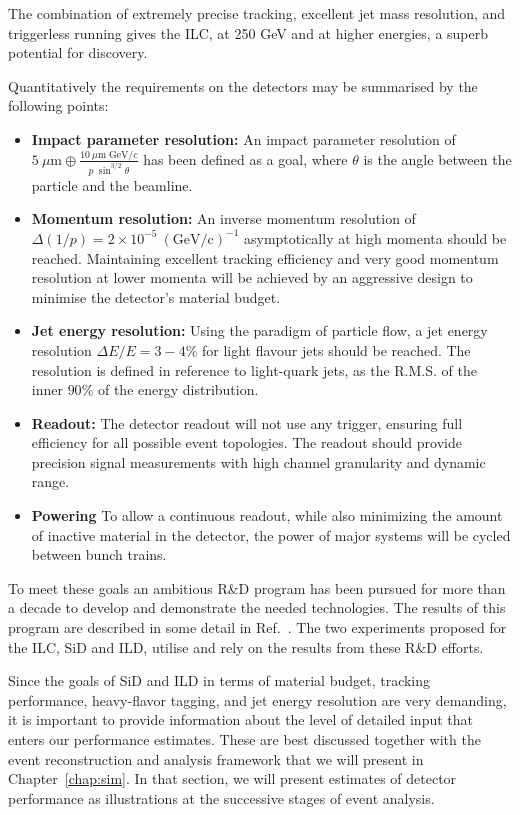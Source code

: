The combination of extremely precise tracking, excellent jet mass
resolution, and triggerless running gives the ILC, at 250 GeV and at
higher energies, a superb potential for discovery. 


Quantitatively the requirements on the detectors may be summarised by the following points: 
\begin{itemize}
    \item {\bf Impact parameter resolution:}  An impact parameter resolution of 
   $ 5~\mu \mathrm{m} \oplus \frac{10~\mu \mathrm{m} \; \mathrm{GeV}/c}{ p\;\sin^{3/2}\theta}$  
   has been defined as a goal, where $\theta$ is the angle between the particle and the beamline. 
    \item {\bf Momentum resolution:} An inverse momentum resolution of $\Delta (1 / p) = 2 \times 10^{-5}~\mathrm{(GeV/c)}^{-1}$
    asymptotically at high momenta should be reached. Maintaining excellent tracking efficiency and very good momentum resolution at lower momenta will be achieved by an aggressive design to minimise the detector's material budget.
    \item {\bf Jet energy resolution:} Using the paradigm of particle flow, a jet energy resolution $\Delta E/ E = 3-4\%$ for light flavour jets should be reached. The resolution is defined in reference to light-quark jets, as the R.M.S. of the inner $90\%$ of the energy distribution. 
    \item {\bf Readout:} The detector readout will not use any trigger, ensuring full efficiency for all possible event topologies.  The readout should provide precision signal measurements with high channel granularity and dynamic range.
    \item {\bf Powering} To allow a continuous readout, while also minimizing the amount of inactive material in the detector, the power of major systems will be cycled between bunch trains. 
\end{itemize}


To meet these goals an ambitious R\&D program has
 been pursued for more than a decade to develop and
 demonstrate the needed technologies. The results of this program are
 described in some detail in Ref.~\cite{janstrube_maximtitov_2021}. 
 The two experiments proposed for
 the ILC, SiD and ILD, utilise and 
rely on the results from these R\&D efforts.

Since the goals of SiD and ILD in terms of material budget, tracking
performance, heavy-flavor tagging, and jet energy resolution are very 
demanding, it is important to provide information about the level
of detailed input that enters our performance estimates.   These are
best
discussed together with the event reconstruction and analysis
framework that we will present in Chapter~\ref{chap:sim}.   In that
section, we will present estimates of detector performance as
illustrations at the successive stages of event analysis. 

